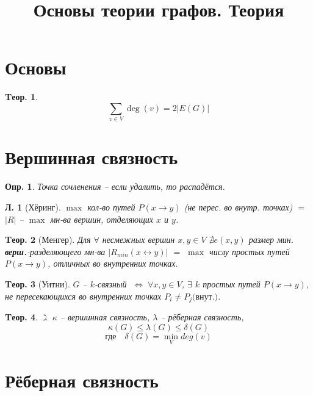 \documentclass[a4paper,12pt]{article}
\title{Основы теории графов. Теория}
\author{}
\date{}
\newtheorem{definition}{Опр.}[section]
\newtheorem{theorem}{Tеор.}[section]
\newtheorem{lemma}{Л.}[theorem]
\def\ilet{$\gimel\;$}
\def\iiff{$\;\Longleftrightarrow\;$}
\begin{document}
\maketitle

\section{Основы}

\begin{theorem}
	\[ \sum_{v \in V} \deg(v) = 2 |E(G)|  \]
\end{theorem}

\section{Вершинная связность}

\begin{definition}
	Точка сочленения -- если удалить, то распадётся.
\end{definition}

\begin{lemma}[Хёринг]
	$\max$ кол-во путей $P(x \rightarrow y)$ (не перес. во внутр. точках) $=$ $|R|$ -- $\max$ мн-ва вершин, отделяющих $x$ и $y$.
\end{lemma}

\begin{theorem}[Менгер]
	Для $\forall$ несмежных вершин $x,y \in V$ $\nexists e(x,y)$ размер мин. \textbf{верш.}-разделяющего мн-ва $|R_{min}(x \leftrightarrow y)|$ $=$ $\max$ числу простых путей $P(x \rightarrow y)$, отличных во внутренних точках.
\end{theorem}

\begin{theorem}[Уитни]
	$G$ -- $k$-связный \iiff $\forall x,y \in V$, $\exists$ $k$ простых путей $P(x \rightarrow y)$, не пересекающихся во внутренних точках $P_i \neq P_j \text{(внут.)}$.
\end{theorem}

\begin{theorem}
	\ilet $\kappa$ -- вершинная связность, $\lambda$ -- рёберная связность,
	\[ \kappa(G) \leqslant \lambda(G) \leqslant \delta(G) \]
	\[ \text{где} \quad \delta(G) = \min_V deg(v) \]
\end{theorem}

\section{Рёберная связность}
\end{document}
